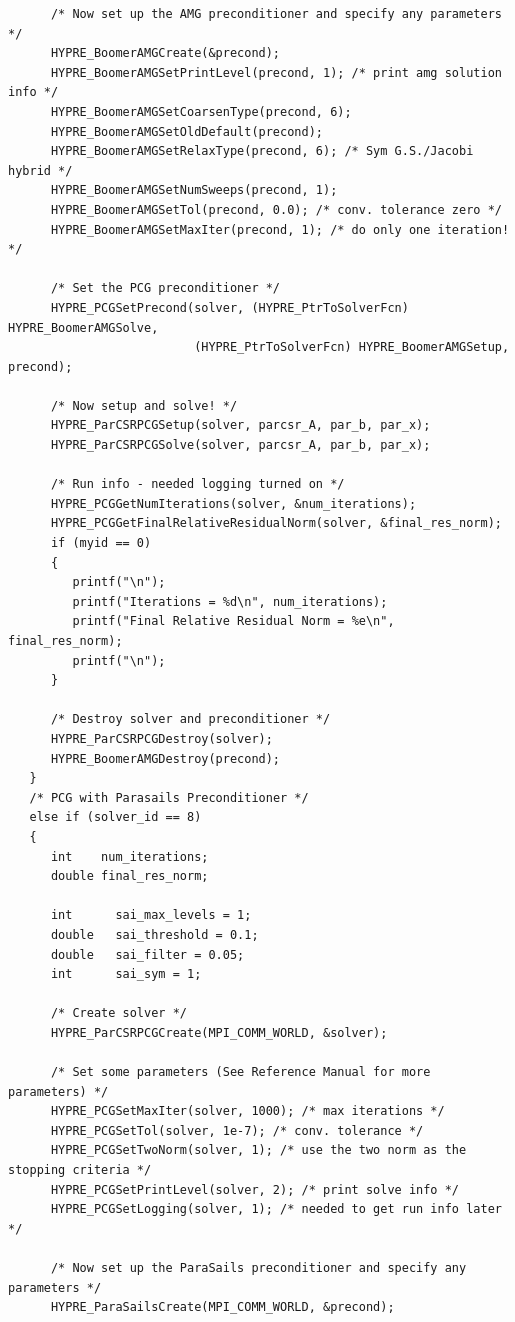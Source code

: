 \documentclass[a4paper,10pt]{article}
\begin{document}
\begin{lstlisting}
      /* Now set up the AMG preconditioner and specify any parameters */
      HYPRE_BoomerAMGCreate(&precond);
      HYPRE_BoomerAMGSetPrintLevel(precond, 1); /* print amg solution info */
      HYPRE_BoomerAMGSetCoarsenType(precond, 6);
      HYPRE_BoomerAMGSetOldDefault(precond); 
      HYPRE_BoomerAMGSetRelaxType(precond, 6); /* Sym G.S./Jacobi hybrid */
      HYPRE_BoomerAMGSetNumSweeps(precond, 1);
      HYPRE_BoomerAMGSetTol(precond, 0.0); /* conv. tolerance zero */
      HYPRE_BoomerAMGSetMaxIter(precond, 1); /* do only one iteration! */

      /* Set the PCG preconditioner */
      HYPRE_PCGSetPrecond(solver, (HYPRE_PtrToSolverFcn) HYPRE_BoomerAMGSolve,
                          (HYPRE_PtrToSolverFcn) HYPRE_BoomerAMGSetup, precond);

      /* Now setup and solve! */
      HYPRE_ParCSRPCGSetup(solver, parcsr_A, par_b, par_x);
      HYPRE_ParCSRPCGSolve(solver, parcsr_A, par_b, par_x);

      /* Run info - needed logging turned on */
      HYPRE_PCGGetNumIterations(solver, &num_iterations);
      HYPRE_PCGGetFinalRelativeResidualNorm(solver, &final_res_norm);
      if (myid == 0)
      {
         printf("\n");
         printf("Iterations = %d\n", num_iterations);
         printf("Final Relative Residual Norm = %e\n", final_res_norm);
         printf("\n");
      }

      /* Destroy solver and preconditioner */
      HYPRE_ParCSRPCGDestroy(solver);
      HYPRE_BoomerAMGDestroy(precond);
   }
   /* PCG with Parasails Preconditioner */
   else if (solver_id == 8)
   {
      int    num_iterations;
      double final_res_norm;

      int      sai_max_levels = 1;
      double   sai_threshold = 0.1;
      double   sai_filter = 0.05;
      int      sai_sym = 1;

      /* Create solver */
      HYPRE_ParCSRPCGCreate(MPI_COMM_WORLD, &solver);

      /* Set some parameters (See Reference Manual for more parameters) */
      HYPRE_PCGSetMaxIter(solver, 1000); /* max iterations */
      HYPRE_PCGSetTol(solver, 1e-7); /* conv. tolerance */
      HYPRE_PCGSetTwoNorm(solver, 1); /* use the two norm as the stopping criteria */
      HYPRE_PCGSetPrintLevel(solver, 2); /* print solve info */
      HYPRE_PCGSetLogging(solver, 1); /* needed to get run info later */

      /* Now set up the ParaSails preconditioner and specify any parameters */
      HYPRE_ParaSailsCreate(MPI_COMM_WORLD, &precond);


\end{lstlisting}
\end{document}
